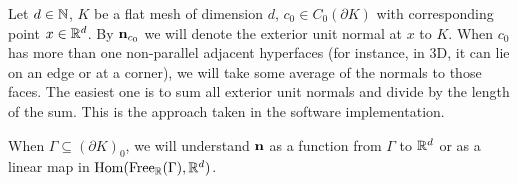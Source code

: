 \begin{notation}
  Let
    $d \in \mathbb{N}$,
    $K$ be a flat mesh of dimension $d$,
    $c_0 \in C_0(\partial K)$ with corresponding point $x \in \mathbb{R}^d$.
  By ${\bf n}_{c_0}$ we will denote the exterior unit normal at $x$ to $K$.
  When $c_{0}$ has more than one non-parallel adjacent hyperfaces
  (for instance, in $3$D, it can lie on an edge or at a corner), we will take
  some average of the normals to those faces.
  The easiest one is to sum all exterior unit normals and divide by the length
  of the sum.
  This is the approach taken in the software implementation.

  When $\Gamma \subseteq (\partial K)_0$, we will understand ${\bf n}$ as
  a function from $\Gamma$ to $\mathbb{R}^d$ or as a linear map in
  $\mathop{\rm Hom}\nolimits({\rm Free}_{\mathbb{R}}(\Gamma), \mathbb{R}^d)$.
\end{notation}
